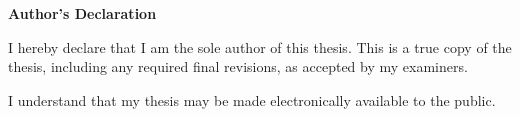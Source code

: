 
\begin{center}\textbf{Author's Declaration}\end{center}

  \noindent
I hereby declare that I am the sole author of this thesis. This is a true copy of the thesis, including any required final revisions, as accepted by my examiners.

  \bigskip
  
  \noindent
I understand that my thesis may be made electronically available to the public.

\cleardoublepage
